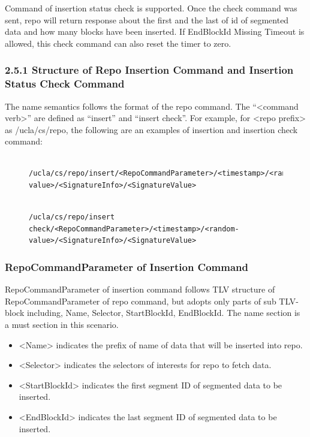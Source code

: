 \documentclass{acm_proc_article-sp}
\begin{document}
Command of insertion status check is supported. Once the check command was sent, repo will return response about the first and the last of id of segmented data and how many blocks have been inserted. If EndBlockId Missing Timeout is allowed, this check command can also reset the timer to zero.

\subsubsection{2.5.1	Structure of Repo Insertion Command and Insertion Status Check Command}
The name semantics follows the format of the repo command. The ``<command verb>'' are defined as ``insert'' and ``insert check''. For example, for <repo prefix> as /ucla/cs/repo, the following are an examples of insertion and insertion check command:

\begin{figure}
\begin{framed}
\begin{BVerbatim}

/ucla/cs/repo/insert/<RepoCommandParameter>/<timestamp>/<random-value>/<SignatureInfo>/<SignatureValue>

\end{BVerbatim}
\end{framed}
\end{figure}

\begin{figure}
\begin{framed}
\begin{BVerbatim}

/ucla/cs/repo/insert check/<RepoCommandParameter>/<timestamp>/<random-value>/<SignatureInfo>/<SignatureValue>

\end{BVerbatim}
\end{framed}
\end{figure}


\subsubsection{RepoCommandParameter of Insertion Command}
RepoCommandParameter of insertion command follows TLV structure of RepoCommandParameter of repo command, but adopts only parts of sub TLV-block including, Name, Selector, StartBlockId, EndBlockId. The name section is a must section in this scenario.

\begin{itemize}
\item <Name> indicates the prefix of name of data that will be inserted into repo.
\item <Selector> indicates the selectors of interests for repo to fetch data.
\item <StartBlockId> indicates the first segment ID of segmented data to be inserted.
\item <EndBlockId> indicates the last segment ID of segmented data to be inserted.
\end{itemize}
\end{document}

